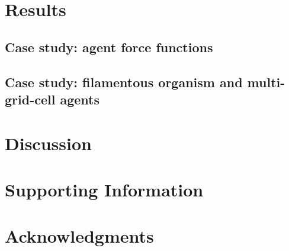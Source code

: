 \documentclass[10pt,letterpaper]{article}
\begin{document}
\section*{Results}


\subsection*{Case study: agent force functions}

\subsection*{Case study: filamentous organism and multi-grid-cell agents}


\section*{Discussion}


\section*{Supporting Information}



\section*{Acknowledgments}

\nolinenumbers

%
%


\end{document}
